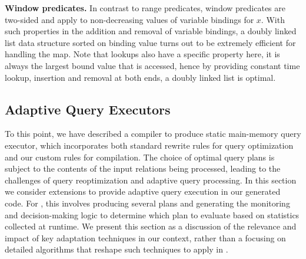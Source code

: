 \textbf{Window predicates.}
In contrast to range predicates, window predicates are two-sided and apply to
non-decreasing values of variable bindings for $x$. With such properties in the
addition and removal of variable bindings, a doubly linked list data structure
sorted on binding value turns out to be extremely efficient for handling the map. Note
that lookups also have a specific property here, it is always the largest bound
value that is accessed, hence by providing constant time lookup, insertion and
removal at both ends, a doubly linked list is optimal.


\subsection{Adaptive Query Executors}

To this point, we have described a compiler to produce static main-memory query
executor, which incorporates both standard rewrite rules for query optimization
and our custom rules for compilation. The choice of optimal query plans is
subject to the contents of the input relations being processed, leading to the
challenges of query reoptimization and adaptive query processing. In this section
we consider extensions to provide adaptive query execution in our generated code.
For \compiler, this involves producing several plans and generating the
monitoring and decision-making logic to determine which plan to evaluate based on
statistics collected at runtime. We present this section as a discussion of the
relevance and impact of key adaptation techniques in our context, rather than a
focusing on detailed algorithms that reshape such techniques to apply in
\compiler.

